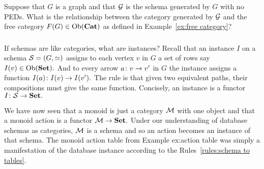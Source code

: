 \documentclass[../main/CT4S-EN-RU]{subfiles}
\begin{document}
\begin{exerciseRUS}
\end{exerciseRUS}

\begin{exerciseENG}
Suppose that $G$ is a graph and that $\mathcal{G}$ is the schema generated by $G$ with no PEDs. What is the relationship between the category generated by $\mathcal{G}$ and the free category $F(G)\in\operatorname{Ob}({\mathbf{Cat}})$ as defined in Example~\ref{ex:free category}?
\end{exerciseENG}

\begin{exerciseRUS}
\end{exerciseRUS}


\subsubsection{}\label{sec:instances}

\begin{blockENG}
If schemas are like categories, what are instances? Recall that an instance $I$ on a schema $\mathcal{S}=(G,\simeq)$ assigns to each vertex $v$ in $G$ a set of rows say $I(v)\in\operatorname{Ob}({\mathbf{Set}}).$ And to every arrow $a\colon v\rightarrow v'$ in $G$ the instance assigns a function $I(a)\colon I(v)\rightarrow I(v').$ The rule is that given two equivalent paths, their compositions must give the same function. Concisely, an instance is a functor $I\colon\mathcal{S}\rightarrow{\mathbf{Set}}.$ 
\end{blockENG}

\begin{blockRUS}
\end{blockRUS}

\begin{exampleENG}
We have now seen that a monoid is just a category $\mathcal{M}$ with one object and that a monoid action is a functor $\mathcal{M}\rightarrow{\mathbf{Set}}.$ Under our understanding of database schemas as categories, $\mathcal{M}$ is a schema and so an action becomes an instance of that schema. The monoid action table from Example {ex:action table} was simply a manifestation of the database instance according to the Rules~\ref{rules:schema to tables}.
\end{exampleENG}

\begin{exampleRUS}
\end{exampleRUS}
\end{document}
